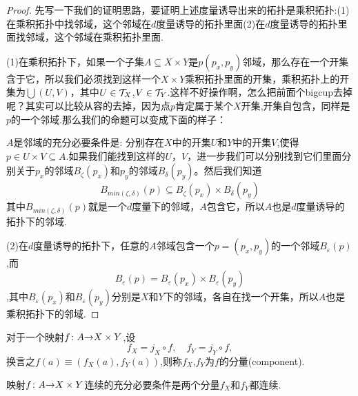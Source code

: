 \begin{proof}
先写一下我们的证明思路，要证明上述度量诱导出来的拓扑是乘积拓扑:(1)在乘积拓扑中找邻域，这个邻域在$d$度量诱导的拓扑里面(2)在$d$度量诱导的拓扑里面找邻域，这个邻域在乘积拓扑里面.

(1)在乘积拓扑下，如果一个子集$A \subseteq X \times Y$是$p(p_x,p_y)$邻域，那么存在一个开集含于它，所以我们必须找到这样一个$X \times Y$乘积拓扑里面的开集，乘积拓扑上的开集为$\bigcup(U,V)$，其中$U \in \mathcal{T}_X$,$V \in \mathcal{T}_Y$.这样不好操作啊，怎么把前面个bigcup去掉呢？其实可以比较从容的去掉，因为点$p$肯定属于某个$X$开集,开集自包含，同样是$p$的一个邻域.那么我们的命题可以变成下面的样子：

$A$是邻域的充分必要条件是: 分别存在$X$中的开集$U$和$Y$中的开集$V$,使得$p \in U \times V \subseteq A$.如果我们能找到这样的$U$，$V$，进一步我们可以分别找到它们里面分别关于$p_x$的邻域$B_\zeta(p_x)$和$p_y$的邻域$B_\delta(p_y)$。然后我们知道\[B_{min(\zeta,\delta)}(p) \subseteq B_\zeta(p_x) \times B_\delta(p_y)\]其中$B_{min(\zeta,\delta)}(p)$就是一个$d$度量下的邻域，$A$包含它，所以$A$也是$d$度量诱导的拓扑下的邻域.

(2)在$d$度量诱导的拓扑下，任意的$A$邻域包含一个$p=(p_x,p_y)$的一个邻域$B_\varepsilon(p)$,而\[B_\varepsilon(p)=B_\varepsilon(p_x) \times B_\varepsilon(p_y)\],其中$B_\varepsilon(p_x)$和$B_\varepsilon(p_y)$分别是$X$和$Y$下的邻域，各自在找一个开集，所以$A$也是乘积拓扑下的邻域.
\end{proof}


\begin{definition}
对于一个映射${f}\colon{A}{\to}{X \times Y}$,设\[f_X = j_X \circ f, \quad f_Y = j_Y \circ f,\]换言之$f(a) \equiv (f_X(a),f_Y(a))$,则称$f_X$,$f_Y$为$f$的分量(component).
\end{definition}

\begin{theorem}
映射${f}\colon{A}{\to}{X \times Y}$连续的充分必要条件是两个分量$f_X$和$f_Y$都连续.
\begin{center}
\end{center}
\end{theorem}

